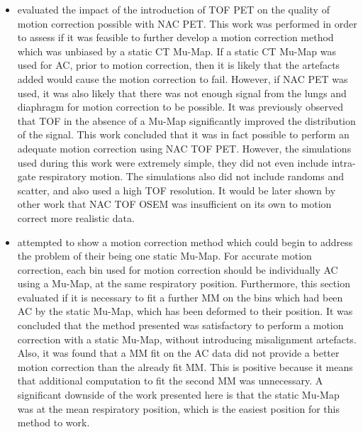         \begin{itemize}
            \item {} evaluated the impact of the introduction of \gls{TOF} \gls{PET} on the quality of motion correction possible with \gls{NAC} \gls{PET}. This work was performed in order to assess if it was feasible to further develop a motion correction method which was unbiased by a static \gls{CT} \gls{Mu-Map}. If a static \gls{CT} \gls{Mu-Map} was used for \gls{AC}, prior to motion correction, then it is likely that the artefacts added would cause the motion correction to fail. However, if \gls{NAC} \gls{PET} was used, it was also likely that there was not enough signal from the lungs and diaphragm for motion correction to be possible. It was previously observed that \gls{TOF} in the absence of a \gls{Mu-Map} significantly improved the distribution of the signal. This work concluded that it was in fact possible to perform an adequate motion correction using \gls{NAC} \gls{TOF} \gls{PET}. However, the simulations used during this work were extremely simple, they did not even include intra-gate respiratory motion. The simulations also did not include randoms and scatter, and also used a high \gls{TOF} resolution. It would be later shown by other work that \gls{NAC} \gls{TOF} \gls{OSEM} was insufficient on its own to motion correct more realistic data.

            \item {} attempted to show a motion correction method which could begin to address the problem of their being one static \gls{Mu-Map}. For accurate motion correction, each bin used for motion correction should be individually \gls{AC} using a \gls{Mu-Map}, at the same respiratory position. Furthermore, this section evaluated if it is necessary to fit a further \gls{MM} on the bins which had been \gls{AC} by the static \gls{Mu-Map}, which has been deformed to their position. It was concluded that the method presented was satisfactory to perform a motion correction with a static \gls{Mu-Map}, without introducing misalignment artefacts. Also, it was found that a \gls{MM} fit on the \gls{AC} data did not provide a better motion correction than the already fit \gls{MM}. This is positive because it means that additional computation to fit the second \gls{MM} was unnecessary. A significant downside of the work presented here is that the static \gls{Mu-Map} was at the mean respiratory position, which is the easiest position for this method to work.


\end{itemize}
